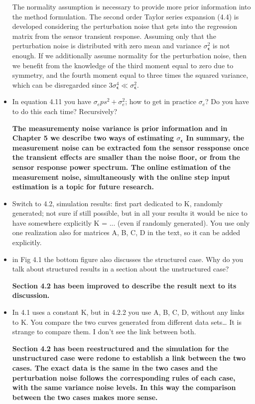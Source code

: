 \documentclass[11pt]{article}
\begin{document}
\begin{itemize}
	\color{blue}
	The normality assumption is necessary to provide more prior information into the method formulation.
    The second order Taylor series expansion (4.4) is developed considering the perturbation noise that gets into the regression matrix from the sensor transient response.
    Assuming only that the perturbation noise is distributed with zero mean and variance $\sigma_{\bm{\epsilon}}^2$ is not enough.
    If we additionally assume normality for the perturbation noise, then we benefit from the knowledge of the third moment equal to zero due to symmetry, and the fourth moment equal to three times the squared variance, which can be disregarded since $3 \sigma_{\bm{\epsilon}}^4 \ll \sigma_{\bm{\epsilon}}^2$\color{black}.
	
	\item   In equation 4.11 you have $\sigma_eps^2 + \sigma_e^2$; how to get in practice $\sigma_e$? Do you have to do this each time? Recursively?
	
	{\bfseries The measurementy noise variance is prior information and in Chapter 5 we describe two ways of estimating $\sigma_{\bm{\epsilon}}$ In summary, the measurement noise can be extracted fom the sensor ressponse once the transient effects are smaller than the noise floor, or from the sensor response power spectrum. The online estimation of the measurement noise, simultaneously with the online step input estimation is a topic for future research.   }
	
	
	\item   Switch to 4.2, simulation results: first part dedicated to K, randomly generated; not sure if still possible, but in all your results it would be nice to have somewhere explicitly K = ... (even if randomly generated). You use only one realization also for matrices A, B, C, D in the text, so it can be added explicitly.
	\item   in Fig 4.1 the bottom figure also discusses the structured case. Why do you talk about structured results in a section about the unstructured case?
	
	{\bfseries Section 4.2 has been improved to describe the result next to its discussion.  }
	
	\item   In 4.1 uses a constant K, but in 4.2.2 you use A, B, C, D, without any links to K. You compare the two curves generated from different data sets… It is strange to compare them. I don't see the link between both.
	
	{\bfseries Section 4.2 has been reestructured and the simulation for the unstructured case were redone to establish a link between the two cases. The exact data is the same in the two cases and the perturbation noise follows the corresponding rules of each case, with the same variance noise levels. In this way the comparison between the two cases makes more sense.  }
	

\end{itemize}
\end{document}
